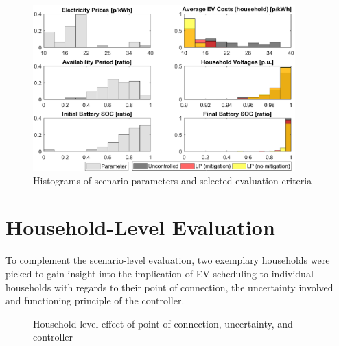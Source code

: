 \begin{figure}[]
	\includegraphics[width=0.9\textwidth,trim={1cm 0cm 1cm 0.5cm},clip]{figures/evaluation/scen/hists.eps}
	\caption{Histograms of scenario parameters and selected evaluation criteria}
	\label{fig:hists}
\end{figure}

\section{Household-Level Evaluation}
\label{sec:hdeval}

To complement the scenario-level evaluation, two exemplary households were picked to gain insight into the implication of EV scheduling to individual households with regards to their point of connection, the uncertainty involved and functioning principle of the controller. 

\begin{figure}[]
	\centering
	\hfill
	\caption{Household-level effect of point of connection, uncertainty, and controller}
	\label{fig:examplehds}
\end{figure}


